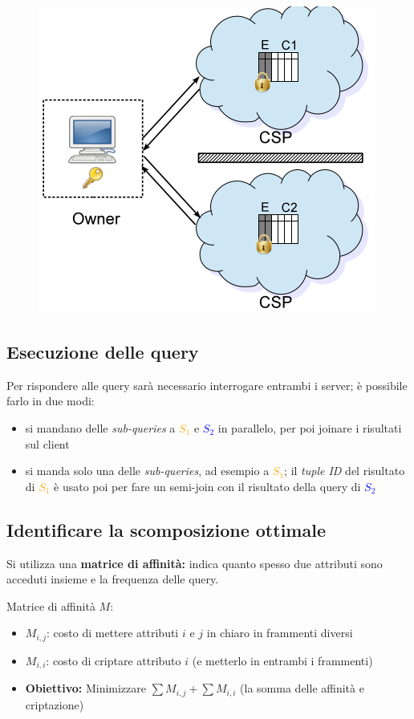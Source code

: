\documentclass{report}
\begin{document}
\begin{figure}[ht]
    \centering
    \includegraphics[width=0.5\linewidth]{images/encryption-fragmentation/couple-frag.png}
\end{figure}

\subsection{Esecuzione delle query}
Per rispondere alle query sarà necessario interrogare entrambi i server; è possibile farlo 
in due modi:
\begin{itemize}
    \item si mandano delle \textit{sub-queries} a \textcolor{orange}{$S_1$} e \textcolor{blue}{$S_2$} in parallelo, per poi 
    joinare i risultati sul client 
    \item si manda solo una delle \textit{sub-queries}, ad esempio a \textcolor{orange}{$S_1$}; il \textit{tuple ID} del risultato 
    di \textcolor{orange}{$S_1$} è usato poi per fare un semi-join con il risultato della query di \textcolor{blue}{$S_2$}
\end{itemize}

\subsection{Identificare la scomposizione ottimale}
Si utilizza una \textbf{matrice di affinità:} indica quanto spesso due attributi 
sono acceduti insieme e la frequenza delle query.

\noindent Matrice di affinità $M$:
\begin{itemize}
    \item $M_{i,j}$: costo di mettere attributi $i$ e $j$ in chiaro in frammenti diversi 
    \item $M_{i,i}$: costo di criptare attributo $i$ (e metterlo in entrambi i frammenti)
    \item \textbf{Obiettivo:} Minimizzare $\sum M_{i,j} + \sum M_{i,i}$ (la somma delle affinità e criptazione)
\end{itemize}
\end{document}
